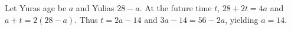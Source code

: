 Let Yura\textquotesingle s age be $a$ and Yulia\textquotesingle s $28-a$. At the future time $t$, $28+2t=4a$ and $a+t=2(28-a)$. Thus $t=2a-14$ and $3a-14=56-2a$, yielding $\boxed{a=14}$.
